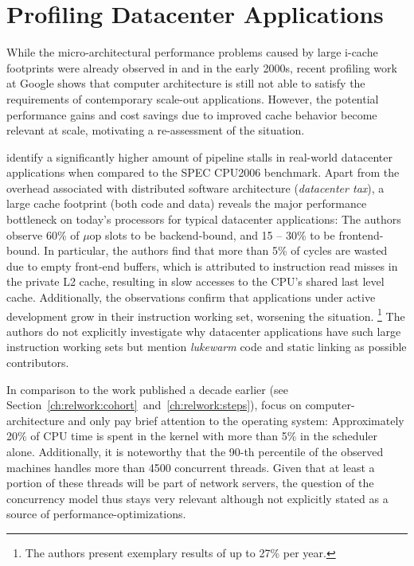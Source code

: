 \documentclass[12pt,a4paper]{book}
\begin{document}
\section{Profiling Datacenter Applications}\label{ch:relwork:profiling}

While the micro-architectural performance problems caused by large i-cache footprints were already observed in \cite{cohort} and \cite{steps} in the early 2000s,
recent profiling work at Google shows that computer architecture is still not able to satisfy the requirements of contemporary scale-out applications.
However, the potential performance gains and cost savings due to improved cache behavior become relevant at scale, motivating a re-assessment of the situation.

\citeauthor*{kanev2015profiling} identify a significantly higher amount of pipeline stalls in real-world datacenter applications when compared to the SPEC CPU2006 benchmark.
Apart from the overhead associated with distributed software architecture (\emph{datacenter tax}),
a large cache footprint (both code and data) reveals the major performance bottleneck on today's processors for typical datacenter applications:
The authors observe 60\% of $\mu$op slots to be backend-bound, and 15 -- 30\% to be frontend-bound.
In particular, the authors find that more than 5\% of cycles are wasted due to empty front-end buffers, which is attributed to instruction read misses in the private L2 cache, resulting in slow accesses to the CPU's shared last level cache.
Additionally, the observations confirm that applications under active development grow in their instruction working set, worsening the situation.%
\footnote{The authors present exemplary results of up to 27\% per year.}
The authors do not explicitly investigate why datacenter applications have such large instruction working sets but mention \emph{lukewarm} code and static linking as possible contributors.~\cite{kanev2015profiling}

In comparison to the work published a decade earlier (see Section~\ref{ch:relwork:cohort}~and~\ref{ch:relwork:steps}),
\citeauthor*{kanev2015profiling} focus on computer-architecture and only pay brief attention to the operating system:
Approximately 20\% of CPU time is spent in the kernel with more than 5\% in the scheduler alone.
Additionally, it is noteworthy that the 90-th percentile of the observed machines handles more than 4500 concurrent threads.
Given that at least a portion of these threads will be part of network servers, the question of the concurrency model thus stays very relevant although not explicitly stated as a source of performance-optimizations.~\cite{kanev2015profiling}
\end{document}
